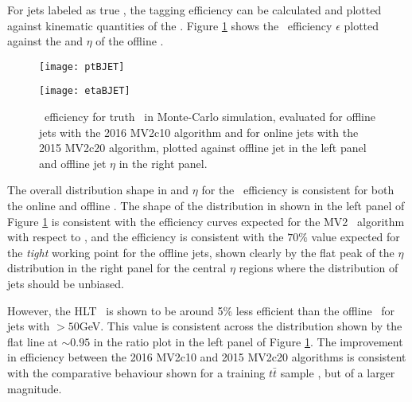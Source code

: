 	For jets labeled as true \bjets, the tagging efficiency can be calculated and plotted against kinematic quantities of the \bjets. Figure \ref{fig:MC:bjetefficiency} shows the \btag\ efficiency $\epsilon$ plotted against the \pt and $\eta$ of the offline \bjet.

		\begin{figure}[h]
			\centering
			\begin{minipage}[h]{0.48\linewidth}
				\texttt{[image: ptBJET]}

			\end{minipage}
			\quad
			\begin{minipage}[h]{0.48\linewidth}
				\texttt{[image: etaBJET]}
			\end{minipage}
			\caption[Comparison of \bjet\ tagging efficiency on truth \bjets\ between online and offline jets in Monte-Carlo simulation]{\btag\, efficiency for truth \bjets\, in Monte-Carlo simulation, evaluated for offline jets with the 2016 MV2c10 algorithm and for online jets with the 2015 MV2c20 algorithm, plotted against offline jet \pt in the left panel and offline jet $\eta$ in the right panel.}
			\label{fig:MC:bjetefficiency}
		\end{figure}

		The overall distribution shape in \pt and $\eta$ for the \btag\ efficiency is consistent for both the online and offline \bjet. The shape of the distribution in \pt shown in the left panel of Figure \ref{fig:MC:bjetefficiency} is consistent with the efficiency curves expected for the MV2 \btag\ algorithm with respect to \pt \cite{btagOptimisation}, and the efficiency is consistent with the $70\%$ value expected for the \textit{tight} working point for the offline jets, shown clearly by the flat peak of the $\eta$ distribution in the right panel for the central $\eta$ regions where the \pt distribution of jets should be unbiased.

		However, the HLT \btag\, is shown to be around 5\% less efficient than the offline \btag\, for jets with \pt$>50$GeV. This value is consistent across the \pt distribution shown by the flat line at $\sim0.95$ in the ratio plot in the left panel of Figure \ref{fig:MC:bjetefficiency}. The improvement in efficiency between the 2016 MV2c10 and 2015 MV2c20 algorithms is consistent with the comparative behaviour shown for a training $t\bar{t}$ sample \cite{btagOptimisation}, but of a larger magnitude.

